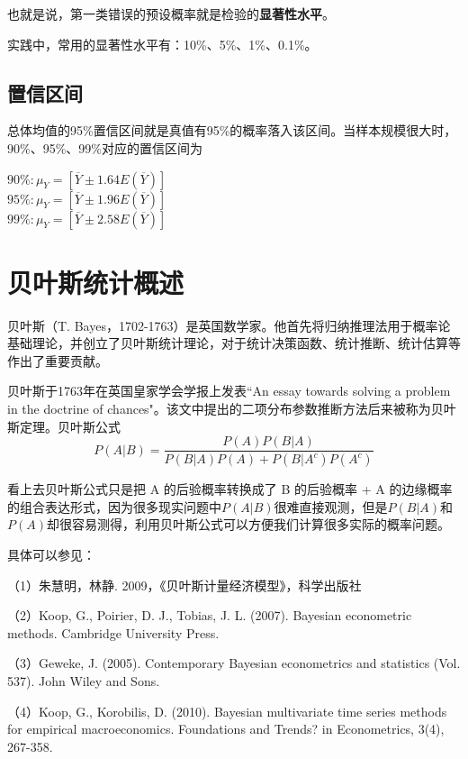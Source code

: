 \documentclass[cn,10pt,math=newtx,citestyle=gb7714-2015,bibstyle=gb7714-2015]{elegantbook}
\begin{document}
	也就是说，第一类错误的预设概率就是检验的\textbf{显著性水平}。
	
	实践中，常用的显著性水平有：10\%、5\%、1\%、0.1\%。
	
	\subsection{置信区间}
	
	总体均值的95\%置信区间就是真值有95\%的概率落入该区间。当样本规模很大时，90\%、95\%、99\%对应的置信区间为
	\begin{center}
		$90\%:\mu_Y=[\overline{Y}\pm{1.64E(\overline{Y})}]$\\
		$95\%:\mu_Y=[\overline{Y}\pm{1.96E(\overline{Y})}]$\\
		$99\%:\mu_Y=[\overline{Y}\pm{2.58E(\overline{Y})}]$
	\end{center}
	
	\section{贝叶斯统计概述}
	贝叶斯（T. Bayes，1702-1763）是英国数学家。他首先将归纳推理法用于概率论基础理论，并创立了贝叶斯统计理论，对于统计决策函数、统计推断、统计估算等作出了重要贡献。
	
	贝叶斯于1763年在英国皇家学会学报上发表“An essay towards solving a problem in the doctrine of chances"。该文中提出的二项分布参数推断方法后来被称为贝叶斯定理。贝叶斯公式
	\begin{equation}
		P(A|B)=\frac{P(A)P(B|A)}{P(B|A)P(A)+P(B|A^c)P(A^c)}
	\end{equation}
	
	看上去贝叶斯公式只是把 A 的后验概率转换成了 B 的后验概率 + A 的边缘概率的组合表达形式，因为很多现实问题中$P(A|B)$很难直接观测，但是$P(B|A)$和$P(A)$却很容易测得，利用贝叶斯公式可以方便我们计算很多实际的概率问题。
	
	具体可以参见：
	
	（1）朱慧明，林静. 2009，《贝叶斯计量经济模型》，科学出版社
	
	（2）Koop, G., Poirier, D. J.,  Tobias, J. L. (2007). Bayesian econometric methods. Cambridge University Press.
	
	（3）Geweke, J. (2005). Contemporary Bayesian econometrics and statistics (Vol. 537). John Wiley and Sons.
	
	（4）Koop, G.,  Korobilis, D. (2010). Bayesian multivariate time series methods for empirical macroeconomics. Foundations and Trends? in Econometrics, 3(4), 267-358.
	
\end{document}

